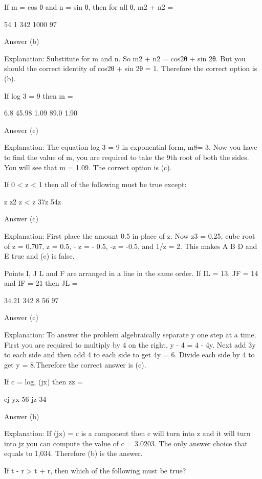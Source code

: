     If m = cos θ and n = sin θ, then for all θ, m2 + n2 =

        54
        1
        342
        1000
        97 

    Answer (b)

    Explanation: Substitute for m and n. So m2 + n2 = cos2θ + sin 2θ. But you should the correct identity of cos2θ + sin 2θ = 1. Therefore the correct option is (b).

    If log 3 = 9 then m =

        6.8
        45.98
        1.09
        89.0
        1.90 

    Answer (c)

    Explanation: The equation log 3 = 9 in exponential form, m8= 3. Now you have to find the value of m, you are required to take the 9th root of both the sides. You will see that m = 1.09. The correct option is (c).

    If 0 < z < 1 then all of the following must be true except:

        z
        z2
        z < z
        37z
        54z 

    Answer (c)

    Explanation: First place the amount 0.5 in place of z. Now z3 = 0.25, cube root of z = 0.707, z = 0.5, - z = - 0.5, -z = -0.5, and 1/z = 2. This makes A B D and E true and (c) is false.

    Points I, J L and F are arranged in a line in the same order. If IL = 13, JF = 14 and IF = 21 then JL =

        34.21
        342
        8
        56
        97 

    Answer (c)

    Explanation: To answer the problem algebraically separate y one step at a time. First you are required to multiply by 4 on the right, y - 4 = 4 - 4y. Next add 3y to each side and then add 4 to each side to get 4y = 6. Divide each side by 4 to get y = 8.Therefore the correct answer is (c).

    If c = log, (jx) then zz =

        cj
        yx
        56
        jz
        34 

    Answer (b)

    Explanation: If (jx) = c is a component then c will turn into z and it will turn into jz you can compute the value of c = 3.0203. The only answer choice that equals to 1,034. Therefore (b) is the answer.

    If t - r > t + r, then which of the following must be true?

